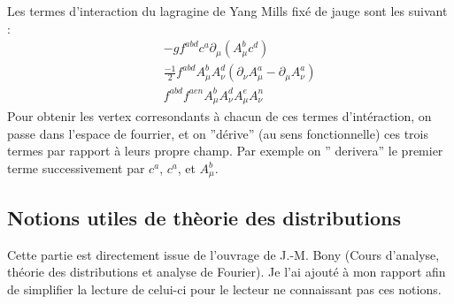 \documentclass[a4paper,11pt]{article}
\theoremstyle{plain}
\theoremstyle{definition}
\theoremstyle{remark}
\numberwithin{equation}{section}
\numberwithin{equation}{subsection}
\numberwithin{figure}{section}
\begin{document}
\noindent
Les termes d'interaction du lagragine de Yang Mills fixé de jauge sont les suivant :
\begin{eqnarray}
 &&  -g f^{abd} c^{a}  \partial_{\mu} \left( A^{b}_{\mu} c^{d} \right)  \\
 &&  \frac{-1}{2}  f^{abd}  A^{b}_{\mu}A^{d}_{\nu}  \left(   \partial_{\nu}A^{a}_{\mu} - \partial_{\mu}A^{a}_{\nu} \right)  \\
 && f^{abd}  f^{aen}  A^{b}_{\mu}A^{d}_{\nu}  A^{e}_{\mu}A^{n}_{\nu} 
\end{eqnarray}
Pour obtenir les vertex corresondants à chacun de ces termes d'intéraction, on passe dans l'espace de fourrier, et on ''dérive'' 
(au sens fonctionnelle) ces trois termes  par rapport à leurs propre champ. Par exemple on '' derivera'' le premier terme successivement 
par $c^{a}$, $c^{a}$, et $A^{b}_{\mu}$.

\subsection{Notions utiles de thèorie des distributions}

\noindent
Cette partie est directement issue de l'ouvrage de J.-M. Bony (Cours d'analyse, théorie des distributions et analyse de Fourier). Je 
l'ai ajouté à mon rapport afin de simplifier la lecture de celui-ci pour le lecteur ne connaissant pas ces notions. \\
\end{document}
